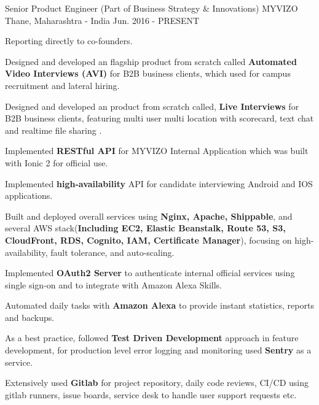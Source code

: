

\begin{cventries}

  \cventry
    {Senior Product Engineer (Part of Business Strategy \& Innovations)} %
    {MYVIZO} %
    {Thane, Maharashtra - India} %
    {Jun. 2016 - PRESENT} %
    {
      \begin{cvitems} %
      	\item {Reporting directly to co-founders.}
        \item {Designed and developed an flagship product from scratch called \textbf{Automated Video Interviews (AVI)} for B2B business clients, which used for campus recruitment and lateral hiring.}
        \item {Designed and developed an product from scratch called, \textbf{ Live Interviews} for B2B business clients, featuring multi user multi location with scorecard, text chat and realtime file sharing .}
        \item {Implemented \textbf{RESTful API} for MYVIZO Internal Application which was built with Ionic 2 for official use.}
        \item {Implemented \textbf{high-availability} API for candidate interviewing Android and IOS applications.}
        \item {Built and deployed overall services using \textbf{Nginx, Apache, Shippable}, and several AWS stack(\textbf{Including EC2, Elastic Beanstalk, Route 53, S3, CloudFront, RDS, Cognito, IAM, Certificate Manager}), focusing on high-availability, fault tolerance, and auto-scaling.}
        \item {Implemented \textbf{OAuth2 Server} to authenticate internal official services using single sign-on and to integrate with Amazon Alexa Skills.}
        \item {Automated daily tasks with \textbf{Amazon Alexa} to provide instant statistics, reports and backups.}
        \item {As a best practice, followed \textbf{Test Driven Development} approach in feature development, for production level error logging and monitoring used \textbf{Sentry} as a service.}
        \item {Extensively used \textbf{Gitlab} for project repository, daily code reviews, CI/CD using gitlab runners, issue boards, service desk to handle user support requests etc. }
      \end{cvitems}
    }


\end{cventries}
